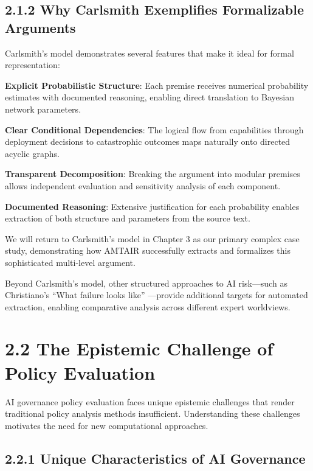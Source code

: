 \documentclass[
  11pt,
  letterpaper,
  openany]{book}
\begin{document}
\subsection{2.1.2 Why Carlsmith Exemplifies Formalizable
Arguments}\label{why-carlsmith-exemplifies-formalizable-arguments}

Carlsmith's model demonstrates several features that make it ideal for
formal representation:

\textbf{Explicit Probabilistic Structure}: Each premise receives
numerical probability estimates with documented reasoning, enabling
direct translation to Bayesian network parameters.

\textbf{Clear Conditional Dependencies}: The logical flow from
capabilities through deployment decisions to catastrophic outcomes maps
naturally onto directed acyclic graphs.

\textbf{Transparent Decomposition}: Breaking the argument into modular
premises allows independent evaluation and sensitivity analysis of each
component.

\textbf{Documented Reasoning}: Extensive justification for each
probability enables extraction of both structure and parameters from the
source text.

We will return to Carlsmith's model in Chapter 3 as our primary complex
case study, demonstrating how AMTAIR successfully extracts and
formalizes this sophisticated multi-level argument.

Beyond Carlsmith's model, other structured approaches to AI risk---such
as Christiano's ``What failure looks like''
\textcite{christiano2019}---provide additional targets for automated
extraction, enabling comparative analysis across different expert
worldviews.

\section{2.2 The Epistemic Challenge of Policy
Evaluation}\label{the-epistemic-challenge-of-policy-evaluation}

AI governance policy evaluation faces unique epistemic challenges that
render traditional policy analysis methods insufficient. Understanding
these challenges motivates the need for new computational approaches.

\subsection{2.2.1 Unique Characteristics of AI
Governance}\label{unique-characteristics-of-ai-governance}
\end{document}
